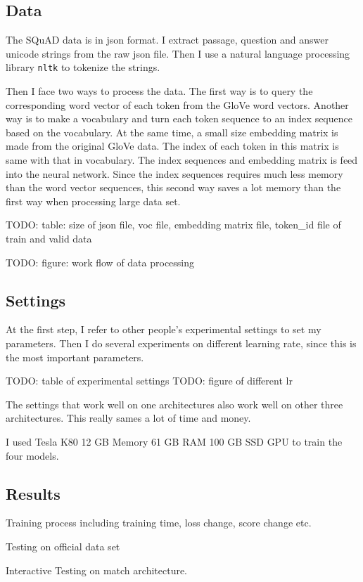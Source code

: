 \documentclass[modernstyle,12pt]{sjsuthesis}
\theoremstyle{definition}
\begin{document}
\subsection{Data}
The SQuAD data is in json format. I extract passage, question and answer unicode strings from the raw json file. Then I use a natural language processing library {\tt nltk} to tokenize the strings.

Then I face two ways to process the data. The first way is to query the corresponding word vector of each token from the GloVe word vectors. Another way is to make a vocabulary and turn each token sequence to an index sequence based on the vocabulary. At the same time, a small size embedding matrix is made from the original GloVe data. The index of each token in this matrix is same with that in vocabulary. The index sequences and embedding matrix is feed into the neural network. Since the index sequences requires much less memory than the word vector sequences, this second way saves a lot memory than the first way when processing large data set.

TODO: table: size of json file, voc file, embedding matrix file, token\_id file of train and valid data

TODO: figure: work flow of data processing

\subsection{Settings}
At the first step, I refer to other people's experimental settings to set my parameters. Then I do several experiments on different learning rate, since this is the most important parameters.

TODO: table of experimental settings
TODO: figure of different lr

The settings that work well on one architectures also work well on other three architectures. This really sames a lot of time and money.


I used Tesla K80 12 GB Memory 61 GB RAM 100 GB SSD GPU to train the four models.

\subsection{Results}

Training process including training time, loss change, score change etc.

Testing on official data set

Interactive Testing on match architecture.
\end{document}
